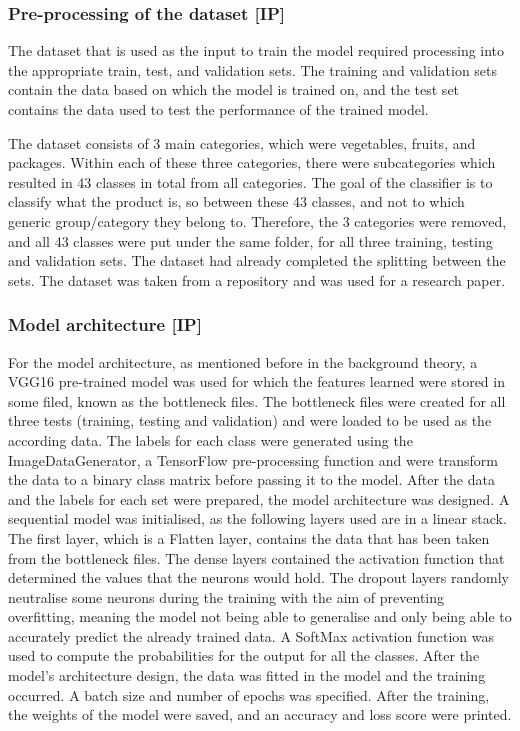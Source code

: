 \subsubsection{Pre-processing of the dataset [IP]}

The dataset that is used as the input to train the model required processing into the appropriate train, test, and validation sets.
The training and validation sets contain the data based on which the model is trained on, and the test set contains the data used to test the performance of the trained model.

The dataset consists of 3 main categories, which were vegetables, fruits, and packages.
Within each of these three categories, there were subcategories which resulted in 43 classes in total from all categories.
The goal of the classifier is to classify what the product is, so between these 43 classes, and not to which generic group/category they belong to.
Therefore, the 3 categories were removed, and all 43 classes were put under the same folder, for all three training, testing and validation sets.
The dataset had already completed the splitting between the sets.
The dataset was taken from a repository \cite{dataset} and was used for a research paper.

\subsubsection{Model architecture [IP]}

For the model architecture, as mentioned before in the background theory, a VGG16 pre-trained model was used for which the features learned were stored in some filed, known as the bottleneck files.
The bottleneck files were created for all three tests (training, testing and validation) and were loaded to be used as the according data.
The labels for each class were generated using the ImageDataGenerator, a TensorFlow pre-processing function and were transform the data to a binary class matrix before passing it to the model.
After the data and the labels for each set were prepared, the model architecture was designed.
A sequential model was initialised, as the following layers used are in a linear stack.
The first layer, which is a Flatten layer, contains the data that has been taken from the bottleneck files.
The dense layers contained the activation function that determined the values that the neurons would hold.
The dropout layers randomly neutralise some neurons during the training with the aim of preventing overfitting, meaning the model not being able to generalise and only being able to accurately predict the already trained data.
A SoftMax activation function was used to compute the probabilities for the output for all the classes.
After the model's architecture design, the data was fitted in the model and the training occurred.
A batch size and number of epochs was specified.
After the training, the weights of the model were saved, and an accuracy and loss score were printed.


